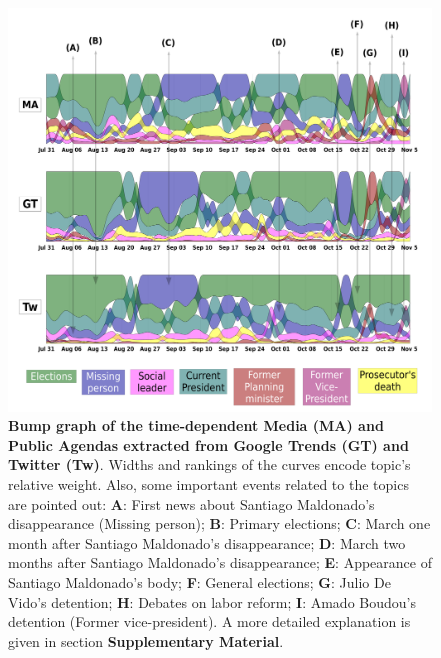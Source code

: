 \documentclass{bmcart}
\begin{document}
\begin{backmatter}
\begin{figure}[h!]
\includegraphics[width = \textwidth]{Fig2.pdf}
\caption{\textbf{Bump graph of the time-dependent Media (MA) and Public Agendas extracted from Google Trends (GT) and Twitter (Tw)}. Widths and rankings of the curves encode topic's relative weight. Also, some important events related to the topics are pointed out:
\textbf{A}: First news about Santiago Maldonado's disappearance (Missing person);
\textbf{B}: Primary elections;
\textbf{C}: March one month after Santiago Maldonado's disappearance;
\textbf{D}: March two months after Santiago Maldonado's disappearance;
\textbf{E}: Appearance of Santiago Maldonado's body;
\textbf{F}: General elections;
\textbf{G}: Julio De Vido's detention;
\textbf{H}: Debates on labor reform;
\textbf{I}: Amado Boudou's detention (Former vice-president).
A more detailed explanation is given in section \textbf{Supplementary Material}.}
\label{fig:all_agenda}
\end{figure}


\end{backmatter}
\end{document}
